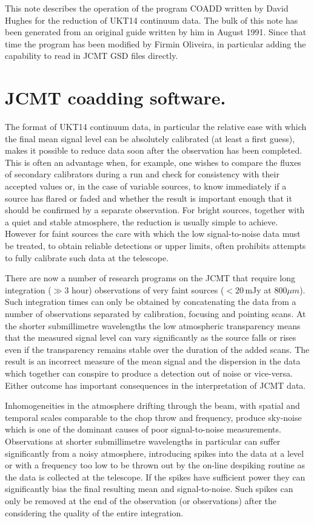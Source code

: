   This note describes the operation of the program COADD written by David
Hughes for the reduction of UKT14 continuum data. The bulk of this note has
been generated from an original guide written by him in August 1991. Since
that time the program has been modified by Firmin Oliveira, in particular
adding the capability to read in JCMT GSD files directly.

\section{JCMT coadding software.}

The format of UKT14 continuum data, in particular the relative ease with which
the final mean signal level can be absolutely calibrated (at least a first
guess), makes it possible to
reduce data soon after the observation has been completed. This is often an
advantage when, for example, one wishes to compare the fluxes of secondary
calibrators during
a run and check for consistency with their accepted values or, in the case of
variable sources, to know immediately if a source has flared or faded and
whether the result is important enough that it should be confirmed by a
separate observation. For bright sources, together with a quiet and stable
atmosphere, the reduction is usually simple to achieve.
However for faint sources the care with which the low signal-to-noise
data must be
treated, to obtain reliable detections or upper limits, often prohibits attempts
to fully calibrate such data at the telescope.

There are now a number of research programs on the JCMT that require long
integration ($\gg 3$ hour) observations of very faint sources ($< 20$\,mJy at
800$\mu m$). Such integration times can only be obtained by
concatenating the data
from a number of observations separated by calibration, focusing and pointing
scans. At the shorter submillimetre wavelengths the low atmospheric
transparency means that the measured signal level can vary significantly as the
source falls or rises even if the transparency remains stable over the duration
of the added scans. The result is an incorrect measure of the mean signal and
the dispersion in the data which together can conspire to produce a detection
out of noise or vice-versa. Either outcome has important consequences in the
interpretation of JCMT data.

Inhomogeneities in the atmosphere drifting through the beam, with spatial and
temporal scales comparable to the chop throw and frequency, produce sky-noise
which is one of the dominant causes of poor signal-to-noise measurements.
Observations at shorter submillimetre wavelengths in particular can suffer
significantly from a noisy atmosphere, introducing spikes into the data at a
level or with a frequency too low to be thrown out  by the on-line despiking
routine as the data is
collected at the telescope. If the spikes have sufficient power they can
significantly bias the final resulting mean and signal-to-noise. Such spikes
can only be removed at the end of the observation (or observations) after
the considering the quality of the entire integration.

